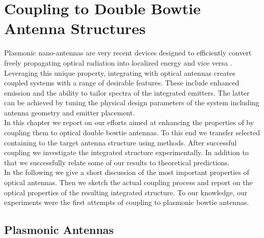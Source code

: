 \section[Coupling \Nds to Optical Antennas]{Coupling \Nds to Double Bowtie Antenna Structures} \label{sec::coupling_antennas}

	Plasmonic nano-antennas are very recent devices designed to efficiently convert freely propagating optical radiation into localized energy and vice versa \cite{Optical Antennas, Palash Bharadwaj, Bradley Deutsch, and Lukas Novotny, nancy::77, nancy::78}. Leveraging this unique property, integrating \sivs with optical antennas creates coupled systems with a range of desirable features. These include enhanced \pl emission and the ability to tailor \pl spectra of the integrated emitters. The latter can be achieved by tuning the physical design parameters of the system including antenna geometry and emitter placement.
	\\
	In this chapter we report on our efforts aimed at enhancing the properties of \sivs by coupling them to optical double bowtie antennas. To this end we transfer selected \nds containing \sivs to the target antenna structure using \pp methods. After successful coupling we investigate the integrated structure experimentally. In addition to that we successfully relate some of our results to theoretical predictions.
	\\
	In the following we give a short discussion of the most important properties of optical antennas. Then we sketch the actual coupling process and report on the optical properties of the resulting integrated structure. To our knowledge, our experiments were the first attempts of coupling \sivs to plasmonic bowtie antennas.

	\subsection{Plasmonic Antennas}

